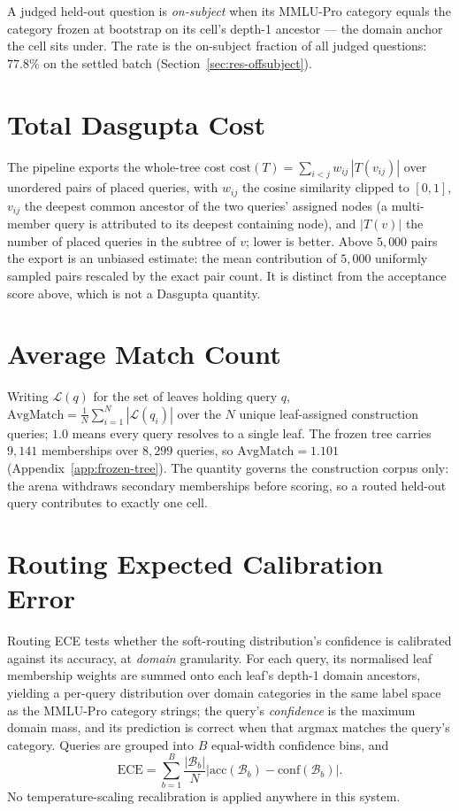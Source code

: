 A judged held-out question is \emph{on-subject} when its MMLU-Pro category equals the
category frozen at bootstrap on its cell's depth-1 ancestor --- the domain anchor the
cell sits under. The rate is the on-subject fraction of all judged questions:
$77.8\%$ on the settled batch (Section~\ref{sec:res-offsubject}).

\section{Total Dasgupta Cost}\label{sec:app-metrics-dasgupta}

The pipeline exports the whole-tree cost \parencite{dasgupta2016cost}
$\text{cost}(T) = \sum_{i<j} w_{ij}\,|T(v_{ij})|$ over unordered pairs of placed
queries, with $w_{ij}$ the cosine similarity clipped to $[0,1]$, $v_{ij}$ the deepest
common ancestor of the two queries' assigned nodes (a multi-member query is attributed
to its deepest containing node), and $|T(v)|$ the number of placed queries in the
subtree of $v$; lower is better. Above $5{,}000$ pairs the export is an unbiased
estimate: the mean contribution of $5{,}000$ uniformly sampled pairs rescaled by the
exact pair count. It is distinct from the acceptance score above, which is not a
Dasgupta quantity.

\section{Average Match Count}\label{sec:app-metrics-avgmatch}

Writing $\mathcal{L}(q)$ for the set of leaves holding query $q$,
$\text{AvgMatch} = \frac{1}{N} \sum_{i=1}^{N} |\mathcal{L}(q_i)|$ over the $N$ unique
leaf-assigned construction queries; $1.0$ means every query resolves to a single leaf.
The frozen tree carries $9{,}141$ memberships over $8{,}299$ queries, so
$\text{AvgMatch} = 1.101$ (Appendix~\ref{app:frozen-tree}). The quantity governs the
construction corpus only: the arena withdraws secondary memberships before scoring, so
a routed held-out query contributes to exactly one cell.

\section{Routing Expected Calibration Error}\label{sec:app-metrics-ece}

Routing ECE tests whether the soft-routing distribution's confidence is calibrated
against its accuracy, at \emph{domain} granularity. For each query, its normalised
leaf membership weights are summed onto each leaf's depth-1 domain ancestors, yielding
a per-query distribution over domain categories in the same label space as the
MMLU-Pro category strings; the query's \emph{confidence} is the maximum domain mass,
and its prediction is correct when that argmax matches the query's category. Queries
are grouped into $B$ equal-width confidence bins, and
\[
\text{ECE} = \sum_{b=1}^{B} \frac{|\mathcal{B}_b|}{N}
\left| \text{acc}(\mathcal{B}_b) - \text{conf}(\mathcal{B}_b) \right|.
\]
No temperature-scaling recalibration is applied anywhere in this system.

